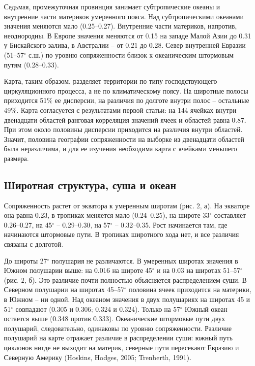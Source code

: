 \documentclass[12pt,a4paper]{article}
\begin{document}
Седьмая, промежуточная провинция занимает субтропические океаны и внутренние части материков умеренного пояса. Над субтропическими океанами значения меняются мало (0.25--0.27). Внутренние части материков, напротив, неоднородны. В Европе значения меняются от 0.15 на западе Малой Азии до 0.31 у Бискайского залива, в Австралии -- от 0.21 до 0.28. Север внутренней Евразии (51--57$^\circ$ с.ш.) по уровню сопряженности близок к океаническим штормовым путям (0.28--0.33).

Карта, таким образом, разделяет территории по типу господствующего циркуляционного процесса, а не по климатическому поясу. На широтные полосы приходится 51\% ее дисперсии, на различия по долготе внутри полос -- остальные 49\%. Карта согласуется с результатами первой статьи: на 144 ячейках внутри двенадцати областей ранговая корреляция значений ячеек и областей равна 0.87. При этом около половины дисперсии приходится на различия внутри областей. Значит, половина географии сопряженности на выборке из двенадцати областей была неразличима, и для ее изучения необходима карта с ячейками меньшего размера.

\subsection{Широтная структура, суша и океан}

Сопряженность растет от экватора к умеренным широтам (рис. 2, а). На экваторе она равна 0.23, в тропиках меняется мало (0.24--0.25), на широте 33$^\circ$ составляет 0.26--0.27, на 45$^\circ$ -- 0.29--0.30, на 57$^\circ$ -- 0.32--0.35. Рост начинается там, где начинаются штормовые пути. В тропиках широтного хода нет, и все различия связаны с долготой.

До широты 27$^\circ$ полушария не различаются. В умеренных широтах значения в Южном полушарии выше: на 0.016 на широте 45$^\circ$ и на 0.03 на широтах 51--57$^\circ$ (рис. 2, б). Это различие почти полностью объясняется распределением суши. В Северном полушарии на широтах 45--57$^\circ$ половина ячеек приходится на материки, в Южном -- ни одной. Над океаном значения в двух полушариях на широтах 45 и 51$^\circ$ совпадают (0.305 и 0.306; 0.324 и 0.324). Только на 57$^\circ$ Южный океан остается выше (0.348 против 0.333). Океанические штормовые пути двух полушарий, следовательно, одинаковы по уровню сопряженности. Различие полушарий на карте отражает различие в распределении суши: южный путь циклонов нигде не выходит на материк, северные пути пересекают Евразию и Северную Америку (Hoskins, Hodges, 2005; Trenberth, 1991).
\end{document}
